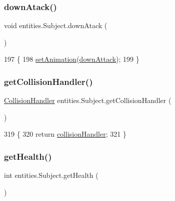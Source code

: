 \subsubsection{\texorpdfstring{down\+Atack()}{downAtack()}}
{\footnotesize\ttfamily void entities.\+Subject.\+down\+Atack (\begin{DoxyParamCaption}{ }\end{DoxyParamCaption})\hspace{0.3cm}{\ttfamily [inline]}}


\begin{DoxyCode}
197                             \{
198         \mbox{\hyperlink{classentities_1_1_animated_sprite_entity_a089bd746df0d8a9d5687240bb34af2dc}{setAnimation}}(\mbox{\hyperlink{classentities_1_1_subject_a5b0e607cea5f2a64d7e7f53035995b7b}{downAttack}});
199     \}
\end{DoxyCode}
\mbox{\label{classentities_1_1_subject_a468ec8565a71cca64835803af89fbc8a}} 
\subsubsection{\texorpdfstring{get\+Collision\+Handler()}{getCollisionHandler()}}
{\footnotesize\ttfamily \mbox{\hyperlink{classentities_1_1_collision_handler}{Collision\+Handler}} entities.\+Subject.\+get\+Collision\+Handler (\begin{DoxyParamCaption}{ }\end{DoxyParamCaption})\hspace{0.3cm}{\ttfamily [inline]}}


\begin{DoxyCode}
319                                                   \{
320         \textcolor{keywordflow}{return} \mbox{\hyperlink{classentities_1_1_mobile_entity_a29fbe797671b1fc81eafe1e48fdc46f9}{collisionHandler}};
321     \}
\end{DoxyCode}
\mbox{\label{classentities_1_1_subject_a5876631b4eb906fe9e1b51dd94a849e4}} 
\subsubsection{\texorpdfstring{get\+Health()}{getHealth()}}
{\footnotesize\ttfamily int entities.\+Subject.\+get\+Health (\begin{DoxyParamCaption}{ }\end{DoxyParamCaption})\hspace{0.3cm}{\ttfamily [inline]}}


